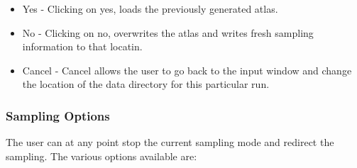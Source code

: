 \documentclass[10pt]{article}
\begin{document}
\begin{itemize}

\item Yes - Clicking on yes, loads the previously generated atlas.

\item No - Clicking on no, overwrites the atlas and writes fresh sampling
information to that locatin.

\item Cancel - Cancel allows the user to go back to the input window and change
the location of the data directory for this particular run.
\end{itemize}



\subsubsection{Sampling Options}
The user can at any point stop the current sampling mode and redirect the
sampling. The various options available are:
\end{document}

